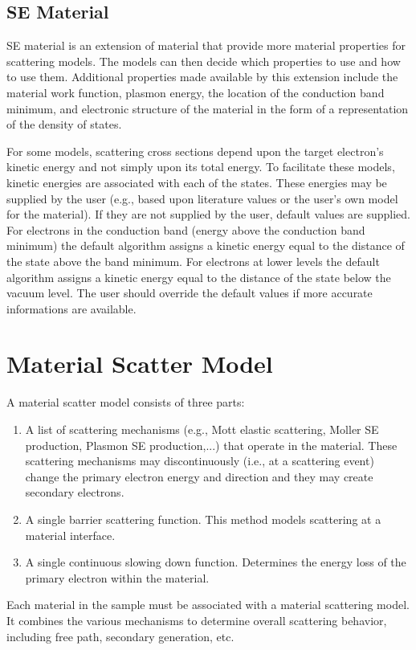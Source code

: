 \subsection{SE Material}\label{subsec:sematerial}
SE material is an extension of material that provide more material properties for scattering models. The models can then decide which properties to use and how to use them. Additional properties made available by this extension include the material work function, plasmon energy, the location of the conduction band minimum, and electronic structure of the material in the form of a representation of the density of states.

For some models, scattering cross sections depend upon the target electron's kinetic energy and not simply upon its total energy. To facilitate these models, kinetic energies are associated with each of the states. These energies may be supplied by the user (e.g., based upon literature values or the user's own model for the material). If they are not supplied by the user, default values are supplied. For electrons in the conduction band (energy above the conduction band minimum) the default algorithm assigns a kinetic energy equal to the distance of the state above the band minimum. For electrons at lower levels the default algorithm assigns a kinetic energy equal to the distance of the state below the vacuum level. The user should override the default values if more accurate informations are available.

\section{Material Scatter Model}\label{con:msm}
A material scatter model consists of three parts:
\begin{enumerate}
\item A list of scattering mechanisms (e.g., Mott elastic scattering, Moller SE production, Plasmon SE production,...) that operate in the material. These scattering mechanisms may discontinuously (i.e., at a scattering event) change the primary electron energy and direction and they may create secondary electrons.
\item A single barrier scattering function. This method models scattering at a material interface.
\item A single continuous slowing down function. Determines the energy loss of the primary electron within the material. 
\end{enumerate}
Each material in the sample must be associated with a material scattering model. It combines the various mechanisms to determine overall scattering behavior, including free path, secondary generation, etc. 


